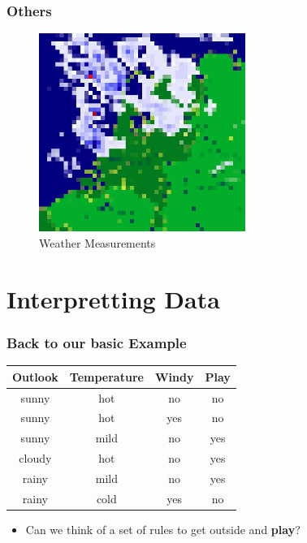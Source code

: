\documentclass{beamer}
\begin{document}
\begin{frame}[t]
  \frametitle{Others}

  \begin{figure}
  \begin{center}
    \includegraphics[width=0.6\textwidth]{./weather.png} %
  \end{center}
  \caption{Weather Measurements}
\end{figure}
\end{frame}

\section{Interpretting Data}%

\begin{frame}[t]
  \frametitle{Back to our basic Example}
\begin{center}
\begin{table}[]
  \centering
  \begin{tabular}{cccc}
    \toprule
    Outlook & Temperature & Windy & Play \\ 
    \midrule
    sunny   & hot         & no    & no   \\ 
    sunny   & hot         & yes   & no   \\ 
    sunny   & mild        & no    & yes  \\ 
    cloudy  & hot         & no    & yes  \\ 
    rainy   & mild        & no    & yes  \\ 
    rainy   & cold        & yes   & no   \\ 
    \bottomrule
  \end{tabular}
\end{table}
\end{center}
\begin{itemize}
  \item Can we think of a set of \alert{rules} to get outside and \textbf{play}?
\end{itemize}

\end{frame}
\end{document}
